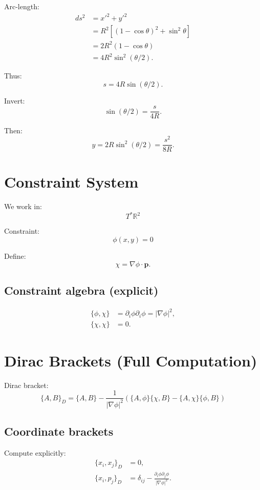 \documentclass[11pt]{article}
\begin{document}
Arc-length:
\begin{align}
ds^2 &= x'^2 + y'^2 \\
&= R^2[(1-\cos\theta)^2 + \sin^2\theta] \\
&= 2R^2(1-\cos\theta) \\
&= 4R^2 \sin^2(\theta/2).
\end{align}

Thus:
\begin{equation}
s = 4R\sin(\theta/2).
\end{equation}

Invert:
\begin{equation}
\sin(\theta/2) = \frac{s}{4R}.
\end{equation}

Then:
\begin{equation}
y = 2R\sin^2(\theta/2) = \frac{s^2}{8R}.
\end{equation}

\section{Constraint System}

We work in:
\[
T^*\mathbb{R}^2
\]

Constraint:
\[
\phi(x,y)=0
\]

Define:
\[
\chi = \nabla\phi \cdot \mathbf{p}.
\]

\subsection{Constraint algebra (explicit)}

\begin{align}
\{\phi,\chi\} &= \partial_i \phi \partial_i \phi = |\nabla\phi|^2,\\
\{\chi,\chi\} &= 0.
\end{align}

\section{Dirac Brackets (Full Computation)}

Dirac bracket:
\[
\{A,B\}_D = \{A,B\}
- \frac{1}{|\nabla\phi|^2}
(\{A,\phi\}\{\chi,B\} - \{A,\chi\}\{\phi,B\})
\]

\subsection{Coordinate brackets}

Compute explicitly:
\begin{align}
\{x_i,x_j\}_D &= 0,\\
\{x_i,p_j\}_D &= \delta_{ij} - \frac{\partial_i \phi \partial_j \phi}{|\nabla\phi|^2}.
\end{align}
\end{document}
